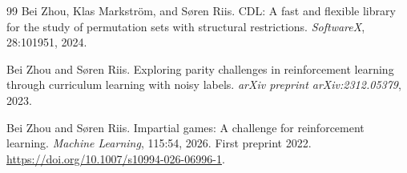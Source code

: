 \documentclass[twoside,11pt]{article}
\numberwithin{theorem}{section}
\numberwithin{equation}{section}
\begin{document}
\begin{thebibliography}{99}
Bei Zhou, Klas Markstr{\"o}m, and S{\o}ren Riis.
\newblock CDL: A fast and flexible library for the study of permutation sets with structural restrictions.
\newblock \emph{SoftwareX}, 28:101951, 2024.

Bei Zhou and S{\o}ren Riis.
\newblock Exploring parity challenges in reinforcement learning through curriculum learning with noisy labels.
\newblock \emph{arXiv preprint arXiv:2312.05379}, 2023.

Bei Zhou and S{\o}ren Riis.
\newblock Impartial games: A challenge for reinforcement learning.
\newblock \emph{Machine Learning}, 115:54, 2026. First preprint 2022.
\newblock \url{https://doi.org/10.1007/s10994-026-06996-1}.

\end{thebibliography}
\end{document}

